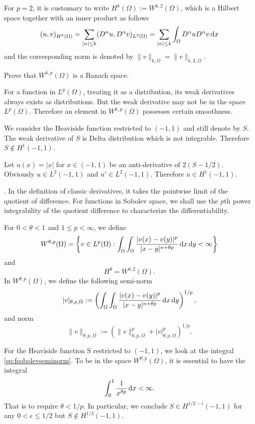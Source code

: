 For $p = 2$, it is customary to write
$H^k(\Omega) := W^{k,2}(\Omega)$, which is a Hilbert space
together with an inner product as follows
\[
(u, v)_{H^k(\Omega)} =\sum_{|\alpha|\leq k}(D^{\alpha}u, D^{\alpha}v)_{L^2(\Omega)}=\sum_{|\alpha|\leq k}\int_{\Omega}D^{\alpha}uD^{\alpha}v\,{\rm d}x
\]
and the corresponding norm is denoted by $\|v\|_{k, \Omega}=\|v\|_{k, 2, \Omega}$.

\begin{exe}
Prove that $W^{k,p}(\Omega)$ is a Banach space.
\end{exe}

For a function in $L^{p}(\Omega)$, treating it as a distribution, its weak derivatives always exists as distributions. But the weak derivative may not be in the space $L^{p}(\Omega)$. Therefore an element in $W^{k,p}(\Omega)$ possesses certain smoothness.

\begin{example}
We consider the Heaviside function restricted to $(-1, 1)$ and still denote
by $S$. The weak derivative of $S$ is Delta distribution which is not integrable. Therefore $S \notin H^1(-1, 1)$.
\end{example}

\begin{example}
Let $u(x)=|x|$ for $x\in(-1,1)$ be an anti-derivative of $2(S-1/2)$. Obviously
$u\in L^2(-1, 1)$ and $u'\in L^2(-1, 1)$. Therefore $u\in H^1(-1, 1)$.
\end{example}


\vskip0.5cm.
In the definition of classic derivatives, it takes the pointwise
limit of the quotient of difference. For functions in Sobolev space, we shall use the
$p$th power integrability of the quotient difference to characterize the differentiability.

For $0<\theta<1$ and $1\leq p<\infty$, we define
\[
W^{\theta, p}(\Omega)=\left\{v\in L^p(\Omega): \int_{\Omega}\int_{\Omega}\frac{|v(x)-v(y)|^p}{|x-y|^{n+\theta p}}\,{\rm d}x\,{\rm d} y<\infty\right\}
\]
and
\[
H^{\theta}=W^{\theta, 2}(\Omega).
\]
In $W^{\theta, p}(\Omega)$, we define the following semi-norm
\begin{equation}\label{eq:fsobolevseminorm}
|v|_{\theta,p,\Omega}:=\left(\int_{\Omega}\int_{\Omega}\frac{|v(x)-v(y)|^p}{|x-y|^{n+\theta p}}\,{\rm d}x\,{\rm d} y\right)^{1/p},
\end{equation}
and norm
\[
\|v\|_{\theta,p,\Omega}:=\left(\|v\|_{0,p,\Omega}^p+|v|_{\theta,p,\Omega}^p\right)^{1/p}.
\]

\begin{example}
For the Heaviside function S restricted to $(-1, 1)$, we look at the integral \eqref{eq:fsobolevseminorm}. To be in the space $W^{\theta, p}(\Omega)$, it is essential
to have the integral
\[
\int_0^1\frac{1}{x^{\theta p}}\,{\rm d}x<\infty.
\]
That is to require $\theta < 1/p$. In particular, we conclude $S\in H^{1/2-\epsilon}(-1, 1)$ for any $0 <\epsilon\leq 1/2$ but $S\notin H^{1/2}(-1, 1)$.
\end{example}

